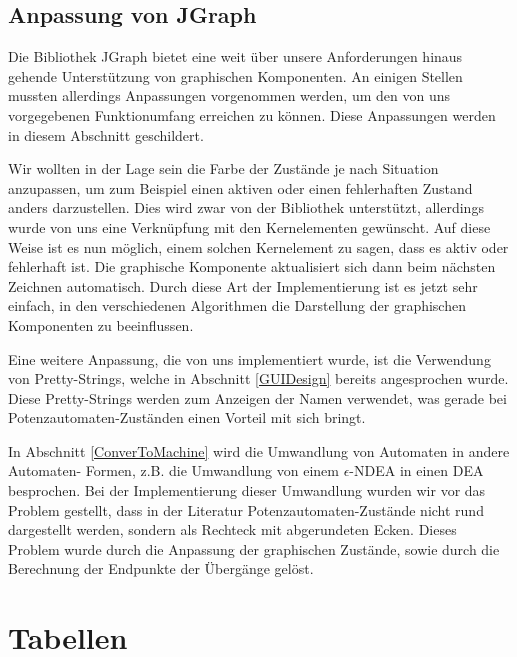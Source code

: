 \subsection{Anpassung von JGraph}\label{GraphJGraphAdaptation}

Die Bibliothek JGraph bietet eine weit über unsere Anforderungen hinaus
gehende Unterstützung von graphischen Komponenten. An einigen Stellen mussten
allerdings Anpassungen vorgenommen werden, um den von uns vorgegebenen
Funktionumfang erreichen zu können. Diese Anpassungen werden in diesem
Abschnitt geschildert.\vspace{10pt}

Wir wollten in der Lage sein die Farbe der Zustände je nach Situation anzupassen,
um zum Beispiel einen aktiven oder einen fehlerhaften Zustand anders
darzustellen. Dies wird zwar von der Bibliothek unterstützt, allerdings wurde von
uns eine Verknüpfung mit den Kernelementen gewünscht. Auf diese Weise ist es nun
möglich, einem solchen Kernelement zu sagen, dass es aktiv oder fehlerhaft ist.
Die graphische Komponente aktualisiert sich dann beim nächsten Zeichnen
automatisch. Durch diese Art der Implementierung ist es jetzt sehr einfach, in
den verschiedenen Algorithmen die Darstellung der graphischen Komponenten zu
beeinflussen.\vspace{10pt}

Eine weitere Anpassung, die von uns implementiert wurde, ist die Verwendung von
Pretty-Strings, welche in Abschnitt \ref{GUIDesign} bereits angesprochen wurde.
Diese Pretty-Strings werden zum Anzeigen der Namen verwendet, was gerade bei
Potenzautomaten-Zuständen einen Vorteil mit sich bringt.\vspace{10pt}

In Abschnitt \ref{ConverToMachine} wird die Umwandlung von Automaten in andere
Automaten- Formen, z.B. die Umwandlung von einem $\epsilon$-NDEA in einen DEA
besprochen. Bei der Implementierung dieser Umwandlung wurden wir vor das Problem
gestellt, dass in der Literatur Potenzautomaten-Zustände nicht rund dargestellt
werden, sondern als Rechteck mit abgerundeten Ecken. Dieses Problem wurde durch
die Anpassung der graphischen Zustände, sowie durch die Berechnung der Endpunkte
der Übergänge gelöst.\vspace{10pt}


\section{Tabellen}\label{Tables}

